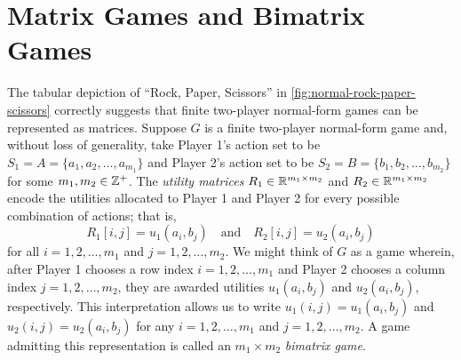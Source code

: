 \section{Matrix Games and Bimatrix Games} \label{sec:matrix-games-and-bimatrix-games}
    The tabular depiction of ``Rock, Paper, Scissors'' in \autoref{fig:normal-rock-paper-scissors} correctly suggests that finite two-player normal-form games can be represented as matrices.
    Suppose $G$ is a finite two-player normal-form game and, without loss of generality, take Player 1's action set to be $S_1 = A = \{a_1, a_2, \ldots, a_{m_1}\}$ and Player 2's action set to be $S_2 = B = \{b_1, b_2, \ldots, b_{m_2}\}$ for some $m_1, m_2 \in \mathbb{Z}^+$.
    The \emph{utility matrices} $R_1 \in \mathbb{R}^{m_1 \times m_2}$ and $R_2 \in \mathbb{R}^{m_1 \times m_2}$ encode the utilities allocated to Player 1 and Player 2 for every possible combination of actions; that is,
    \[
        R_1[i, j]
            = u_1(a_i, b_j)
        \quad\text{and}\quad
        R_2[i, j]
            = u_2(a_i, b_j)
    \]
    for all $i = 1, 2, \ldots, m_1$ and $j = 1, 2, \ldots, m_2$.
    We might think of $G$ as a game wherein, after Player 1 chooses a row index $i = 1, 2, \ldots, m_1$ and Player 2 chooses a column index $j = 1, 2, \ldots, m_2$, they are awarded utilities $u_1(a_i, b_j)$ and $u_2(a_i, b_j)$, respectively.
    This interpretation allows us to write $u_1(i, j) = u_1(a_i, b_j)$ and $u_2(i, j) = u_2(a_i, b_j)$ for any $i = 1, 2, \ldots, m_1$ and $j = 1, 2, \ldots, m_2$.
    A game admitting this representation is called an $m_1 \times m_2$ \emph{bimatrix game}.

